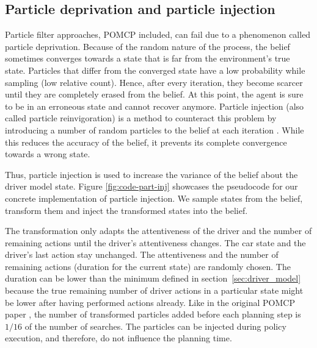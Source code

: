 \subsection{Particle deprivation and particle injection}
\label{sec:particle_deprivation}

Particle filter approaches, POMCP included, can fail due to a phenomenon called particle deprivation. Because of the random nature of the process, the belief sometimes converges towards a state that is far from the environment's true state. Particles that differ from the converged state have a low probability while sampling (low relative count). Hence, after every iteration, they become scarcer until they are completely erased from the belief. At this point, the agent is sure to be in an erroneous state and cannot recover anymore. Particle injection (also called particle reinvigoration) is a method to counteract this problem by introducing a number of random particles to the belief at each iteration \parencite{decision_making_book}. While this reduces the accuracy of the belief, it prevents its complete convergence towards a wrong state. 

Thus, particle injection is used to increase the variance of the belief about the driver model state. Figure \ref{fig:code-part-inj} showcases the pseudocode for our concrete implementation of particle injection. We sample states from the belief, transform them and inject the transformed states into the belief. 

The transformation only adapts the attentiveness of the driver and the number of remaining actions until the driver's attentiveness changes. The car state and the driver's last action stay unchanged. The attentiveness and the number of remaining actions (duration for the current state) are randomly chosen. The duration can be lower than the minimum defined in section~\ref{sec:driver_model} because the true remaining number of driver actions in a particular state might be lower after having performed actions already. Like in the original POMCP paper \parencite{pomcp}, the number of transformed particles added before each planning step is $1/16$ of the number of searches. The particles can be injected during policy execution, and therefore, do not influence the planning time.

